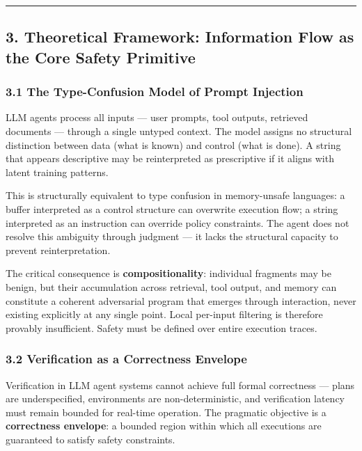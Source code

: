 \begin{center}\rule{0.5\linewidth}{0.5pt}\end{center}

\subsection{3. Theoretical Framework: Information Flow as the Core
Safety
Primitive}\label{theoretical-framework-information-flow-as-the-core-safety-primitive}

\subsubsection{3.1 The Type-Confusion Model of Prompt
Injection}\label{the-type-confusion-model-of-prompt-injection}

LLM agents process all inputs --- user prompts, tool outputs, retrieved
documents --- through a single untyped context. The model assigns no
structural distinction between data (what is known) and control (what is
done). A string that appears descriptive may be reinterpreted as
prescriptive if it aligns with latent training patterns.

This is structurally equivalent to type confusion in memory-unsafe
languages: a buffer interpreted as a control structure can overwrite
execution flow; a string interpreted as an instruction can override
policy constraints. The agent does not resolve this ambiguity through
judgment --- it lacks the structural capacity to prevent
reinterpretation.

The critical consequence is \textbf{compositionality}: individual
fragments may be benign, but their accumulation across retrieval, tool
output, and memory can constitute a coherent adversarial program that
emerges through interaction, never existing explicitly at any single
point. Local per-input filtering is therefore provably insufficient.
Safety must be defined over entire execution traces.

\subsubsection{3.2 Verification as a Correctness
Envelope}\label{verification-as-a-correctness-envelope}

Verification in LLM agent systems cannot achieve full formal correctness
--- plans are underspecified, environments are non-deterministic, and
verification latency must remain bounded for real-time operation. The
pragmatic objective is a \textbf{correctness envelope}: a bounded region
within which all executions are guaranteed to satisfy safety
constraints.

